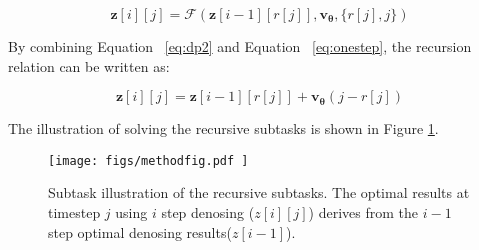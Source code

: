 \documentclass[10pt,twocolumn,letterpaper]{article}
\begin{document}
    \begin{equation} \label{eq:dp2}
        \bm{z}[i][j] = \mathcal{F}(\bm{z}[i-1][r[j]], \bm{v_\theta}, \{r[j],j\})
    \end{equation}

    By combining Equation ~\ref{eq:dp2} and Equation ~\ref{eq:onestep}, the recursion relation can be written as:

    \begin{equation} \label{eq:dp3}
        \bm{z}[i][j] =  \bm{z}[i-1][r[j]] + \bm{v_{\theta}}(j-r[j])
    \end{equation}

    The illustration of solving the recursive subtasks is shown in Figure \ref{fig:method}. 

    \begin{figure}
        \centering
        \texttt{[image: 
            figs/methodfig.pdf
        ]}
        \vspace{-0.5cm}
        \caption{Subtask illustration of the recursive subtasks. The optimal results at timestep $j$ using $i$ step denosing ($z[i][j]$) derives from the $i-1$ step optimal denosing results($z[i-1]$).}
        \label{fig:method}
    \end{figure}
\end{document}
